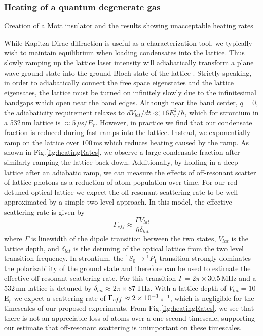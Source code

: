 \subsubsection{Heating of a quantum degenerate gas}
\label{sssec:sideband_cooling}

Creation of a Mott insulator and the results showing unacceptable heating rates

While Kapitza-Dirac diffraction is useful as a characterization tool, we typically wish to maintain equilibrium when loading condensates into the lattice. Thus slowly ramping up the lattice laser intensity will adiabatically transform a plane wave ground state into the ground Bloch state of the lattice \cite{Sakurai2010}. Strictly speaking, in order to adiabatically connect the free space eigenstates and the lattice eigensates, the lattice must be turned on infinitely slowly due to the infinitesimal bandgaps which open near the band edges. Although near the band center, $q=0$, the adiabaticity requirement relaxes to $dV_{lat}/dt \ll 16E_r^2/ \hbar$, \cite{Denschlag2002} which for strontium in a 532\,nm lattice is $\approx 5\,\mu$s$/E_r$. However, in practice we find that our condensate fraction is reduced during fast ramps into the lattice. Instead, we exponentially ramp on the lattice over $100\,$ms which reduces heating caused by the ramp. As shown in Fig.\;\ref{fig:heatingRates}, we observe a large condensate fraction after similarly ramping the lattice back down. Additionally, by holding in a deep lattice after an adiabatic ramp, we can measure the effects of off-resonant scatter of lattice photons as a reduction of atom population over time. For our red detuned optical lattice we expect the off-resonant scattering rate to be well approximated by a simple two level approach. In this model, the effective scattering rate is given by \cite{Jaksch2005}
	\begin{equation} \label{eq:offResScatter}
		\Gamma_{eff} \approx \frac{\Gamma V_{lat}}{\hbar \delta_{lat}}
	\end{equation}
where $\Gamma$ is linewidth of the dipole transition between the two states, $V_{lat}$ is the lattice depth, and $\delta_{lat}$ is the detuning of the optical lattice from the two level transition frequency. In strontium, the $^1S_0\!\rightarrow\!^1P_1$ transition strongly dominates the polarizability of the ground state and therefore can be used to estimate the effective off-resonant scattering rate. For this transition $\Gamma = 2 \pi \times 30.5\,$MHz and a 532\,nm lattice is detuned by $\delta_{lat} \approx 2 \pi \times 87\,$THz. With a lattice depth of $V_{lat}=10\,$E$_r$ we expect a scattering rate of $\Gamma_{eff} \approx 2\times 10^{-1}\,$s$^{-1}$, which is negligible for the timescales of our proposed experiments. From Fig.\;\ref{fig:heatingRates}, we see that there is not an appreciable loss of atoms over a one second timescale, supporting our estimate that off-resonant scattering is unimportant on these timescales.
